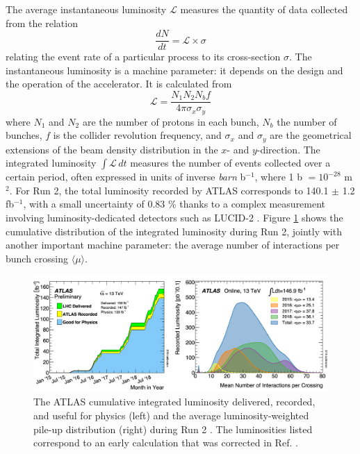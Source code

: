 The average instantaneous luminosity $\mathcal{L}$ measures the quantity of data collected from the relation
\begin{equation}
  \frac{dN}{dt} = \mathcal{L} \times \sigma
\end{equation}
relating the event rate of a particular process to its cross-section $\sigma$. The instantaneous luminosity is a machine parameter: it depends on the design and the operation of the accelerator. It is calculated from
\begin{equation}
  \mathcal{L} = \frac{N_1N_2N_bf}{4\pi\sigma_x\sigma_y}
\end{equation}
where $N_1$ and $N_2$ are the number of protons in each bunch, $N_b$ the number of bunches, $f$ is the collider revolution frequency, and $\sigma_x$ and $\sigma_y$ are the geometrical extensions of the beam density distribution in the $x$- and $y$-direction. The integrated luminosity $\int \mathcal{L}\, dt$ measures the number of events collected over a certain period, often expressed in units of inverse \textit{barn} b$^{-1}$, where 1 b $= 10^{-28}$ m$^{2}$. For Run 2, the total luminosity recorded by ATLAS corresponds to 140.1 $\pm$ 1.2 fb$^{-1}$, with a small uncertainty of 0.83 \% \cite{ATLAS:2022hro} thanks to a complex measurement involving luminosity-dedicated detectors such as LUCID-2 \cite{Avoni_2018}. Figure \ref{fig-atlasLumiPileup} shows the cumulative distribution of the integrated luminosity during Run 2, jointly with another important machine parameter: the average number of interactions per bunch crossing $\langle \mu\rangle$.

\begin{figure}[!h]
  \centering
  \includegraphics[width=\textwidth]{Images/ATLAS/recoATLAS.png}
  \caption{The ATLAS cumulative integrated luminosity delivered, recorded, and useful for physics (left) and the average luminosity-weighted pile-up distribution (right) during Run 2  \cite{PubAtlasLumi}. The luminosities listed correspond to an early calculation that was corrected in Ref. \cite{ATLAS:2022hro}.}
  \label{fig-atlasLumiPileup}
\end{figure}

